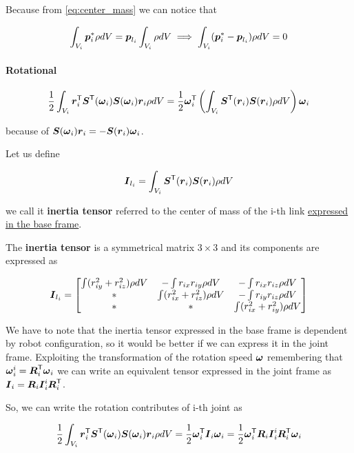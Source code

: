 Because from \autoref{eq:center_mass} we can notice that

\[
	\int_{V_i} \boldsymbol{p}_i^* \rho dV = \boldsymbol{p}_{l_i} \int_{V_i} \rho dV
	\implies
	\int_{V_i} (\boldsymbol{p}_i^* - \boldsymbol{p}_{l_i}) \rho dV = 0
\]

\paragraph{Rotational}

\[
	\frac{1}{2} \int_{V_i} \boldsymbol{r}_i^{\mathsf{T}} \boldsymbol{S}^{\mathsf{T}}(\boldsymbol{\omega}_i) \boldsymbol{S}(\boldsymbol{\omega}_i) \boldsymbol{r}_i \rho dV =
	\frac{1}{2} \boldsymbol{\omega}_i^{\mathsf{T}} \left( \int_{V_i} \boldsymbol{S}^{\mathsf{T}}(\boldsymbol{r}_i) \boldsymbol{S}(\boldsymbol{r}_i) \rho dV \right) \boldsymbol{\omega}_i
\]

because of $\boldsymbol{S}(\boldsymbol{\omega}_i) \boldsymbol{r}_i = - \boldsymbol{S}(\boldsymbol{r}_i)\boldsymbol{\omega}_i$.

Let us define

\[ \boldsymbol{I}_{l_i} = \int_{V_i} \boldsymbol{S}^{\mathsf{T}}(\boldsymbol{r}_i) \boldsymbol{S}(\boldsymbol{r}_i) \rho dV \]

we call it \textbf{inertia tensor} referred to the center of mass of the i-th link \ul{expressed in the base frame}.

The \textbf{inertia tensor} is a symmetrical matrix $3 \times 3$ and its components are expressed as

\[
	\boldsymbol{I}_{l_i} =
	\begin{bmatrix}
		\int (r_{iy}^2 + r_{iz}^2) \rho dV & - \int r_{ix}r_{iy} \rho dV & - \int r_{ix}r_{iz} \rho dV \\
		* & \int (r_{ix}^2 + r_{iz}^2) \rho dV & - \int r_{iy}r_{iz} \rho dV \\
		* & * & \int (r_{ix}^2 + r_{iy}^2) \rho dV
	\end{bmatrix}
\]

We have to note that the inertia tensor expressed in the base frame is dependent by robot configuration, so it would be better if we can express it in the joint frame.
Exploiting the transformation of the rotation speed $\boldsymbol{\omega}$ remembering that $\boldsymbol{\omega}_i^i = \boldsymbol{R}_i^{\mathsf{T}}\boldsymbol{\omega}_i$ we can write an equivalent tensor expressed in the joint frame as $\boldsymbol{I}_i=\boldsymbol{R}_i \boldsymbol{I}_i^i \boldsymbol{R}_i^{\mathsf{T}}$.

So, we can write the rotation contributes of i-th joint as

\[
	\frac{1}{2} \int_{V_i} \boldsymbol{r}_i^{\mathsf{T}} \boldsymbol{S}^{\mathsf{T}}(\boldsymbol{\omega}_i) \boldsymbol{S}(\boldsymbol{\omega}_i) \boldsymbol{r}_i \rho dV =
	\frac{1}{2} \boldsymbol{\omega}_i^{\mathsf{T}} \boldsymbol{I}_i \boldsymbol{\omega}_i =
	\frac{1}{2} \boldsymbol{\omega}_i^{\mathsf{T}} \boldsymbol{R}_i \boldsymbol{I}_i^i \boldsymbol{R}_i^{\mathsf{T}} \boldsymbol{\omega}_i
\]


